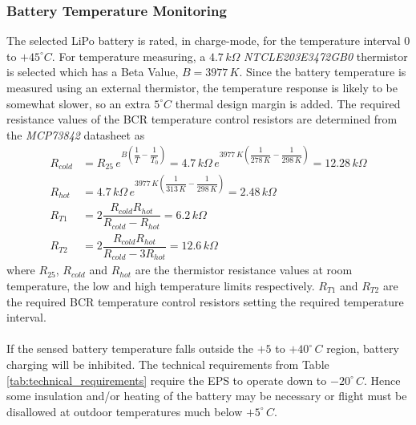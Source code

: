 \subsubsection{Battery Temperature Monitoring}
The selected \ac{LiPo} battery is rated, in charge-mode, for the temperature interval $0$ to $+45^{\circ}C$. For temperature measuring, a $4.7\,k \Omega$ \textit{NTCLE203E3472GB0} thermistor is selected which has a Beta Value, $B=3977\,K$. Since the battery temperature is measured using an external thermistor, the temperature response is likely to be somewhat slower, so an extra $5^{\circ}C$ thermal design margin is added. The required resistance values of the \ac{BCR} temperature control resistors are determined from the \textit{MCP73842} datasheet as 
%
\begin{equation}
\begin{split}
R_{cold}&=R_{25}\,e^{B(\dfrac{1}{T}-\dfrac{1}{T_0})}=4.7\,k\Omega \,e^{3977\,K(\dfrac{1}{278	\,K}-\dfrac{1}{298\,K})}=12.28\,k\Omega\\
R_{hot}&=4.7\,k\Omega \, e^{3977\,K(\dfrac{1}{313	\,K}-\dfrac{1}{298\,K})}=2.48\,k\Omega\\
R_{T1}&=2\dfrac{R_{cold}R_{hot}}{R_{cold}-R_{hot}}=6.2\,k\Omega\\
R_{T2}&=2\dfrac{R_{cold}R_{hot}}{R_{cold}-3R_{hot}}=12.6\,k\Omega
\end{split}
\end{equation}
%
where $R_{25}$, $R_{cold}$ and $R_{hot}$ are the thermistor resistance values at room temperature, the low and high temperature limits respectively. $R_{T1}$ and $R_{T2}$ are the required \ac{BCR} temperature control resistors setting the required temperature interval.
\\
\\
If the sensed battery temperature falls outside the $+5$ to $+40^{\circ}\,C$ region, battery charging will be inhibited. The technical requirements from Table \ref{tab:technical_requirements} require the \ac{EPS} to operate down to $-20^{\circ}\,C$. Hence some insulation and/or heating of the battery may be necessary or flight must be disallowed at outdoor temperatures much below $+5^{\circ}\,C$.
%
